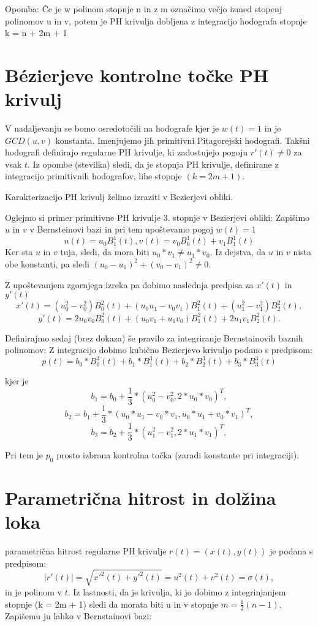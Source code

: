 \documentclass[12pt]{article}
\begin{document}
Opomba:
Če je w polinom stopnje n in z m označimo večjo izmed stopenj polinomov u in v, 
potem je PH krivulja dobljena z integracijo hodografa stopnje k = n + 2m + 1

\section{B\'ezierjeve kontrolne točke PH krivulj}
V nadaljevanju se bomo osredotočili na hodografe kjer je $w(t) = 1$ in je $GCD(u,v)$ konstanta.
Imenjujemo jih primitivni Pitagorejski hodografi. 
Takšni hodografi definirajo regularne PH krivulje, ki zadostujejo pogoju $r'(t) \neq 0$ za vsak $t$. 
Iz opombe (stevilka) sledi, da je stopnja PH krivulje, definirane z integracijo
primitivnih hodografov, lihe stopnje $(k = 2m + 1)$.

Karakterizacijo PH krivulj želimo izraziti v Bezierjevi obliki.

Oglejmo si primer primitivne PH krivulje 3. stopnje v Bezierjevi obliki:
Zapišimo $u$ in $v$ v Bernsteinovi bazi in pri tem upoštevamo pogoj $w(t) = 1$
$$u(t) = u_0 B^1_1(t), v(t) = v_0 B^1_0(t) + v_1 B^1_1(t)$$
Ker sta $u$ in $v$ tuja, sledi, da mora biti $u_0*v_1 \neq u_1*v_0$. Iz dejstva, da
$u$ in $v$ nista obe konstanti, pa sledi $(u_0 - u_1)^2 + (v_0 - v_1)^2 \neq 0$.

Z upoštevanjem zgornjega izreka pa dobimo naslednja predpisa za $x'(t)$ in $y'(t)$
$$x'(t) = (u_0^2 - v_0^2) B_0^2(t) + (u_0 u_1 - v_0 v_1) B_1^2(t) + (u_1^2 - v_1^2) B_2^2(t),$$
$$y'(t) = 2 u_0 v_0 B_0^2(t) + (u_0 v_1 + u_1 v_0) B_1^2(t) + 2 u_1 v_1 B_2^2(t).$$

Definirajmo sedaj (brez dokaza) še pravilo za integriranje Bernstainovih baznih polinomov:
Z integracijo dobimo kubično Bezierjevo krivuljo podano s predpisom:
$$p(t) = b_0*B_0^3(t) + b_1*B_1^3(t) + b_2*B_2^3(t) + b_3*B_3^3(t)$$

kjer je
$$b_1 = b_0 + \frac{1}{3}*(u_0^2 - v_0^2, 2*u_0*v_0)^T,$$
$$b_2 = b_1 + \frac{1}{3}*(u_0*u_1 - v_0*v_1, u_0*u_1 + v_0*v_1)^T,$$
$$b_3 = b_2 + \frac{1}{3}*(u_1^2 - v_1^2, 2*u_1*v_1)^T,$$

Pri tem je $p_0$ prosto izbrana kontrolna točka (zaradi konstante pri integraciji).

\section*{Parametrična hitrost in dolžina loka}
parametrična hitrost regularne PH krivulje $r(t) = (x(t), y(t))$ je podana s predpisom:
$$ | r\prime (t) | =\sqrt{x\prime^2(t)+y\prime^2(t)}= u^2 (t) + v^2 (t) = \sigma (t),$$
in je polinom v $t$. 
Iz lastnosti, da je krivulja, ki jo dobimo z integrinjanjem stopnje (k = 2m + 1) sledi
da morata biti u in v stopnje  $m = \frac{1}{2}(n - 1)$. Zapišemu ju lahko v 
Bernstainovi bazi:
\end{document}
